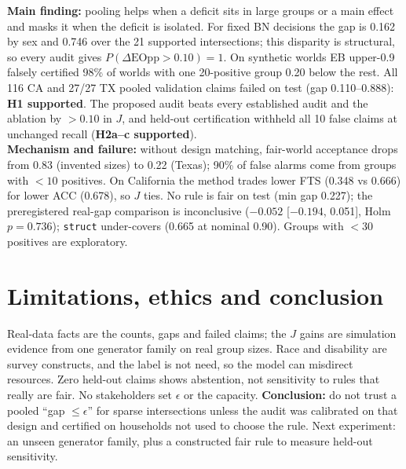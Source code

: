 \documentclass[11pt,a4paper]{article}
\begin{document}
\textbf{Main finding:} pooling helps when a deficit sits in large groups or a main effect and masks it when the
deficit is isolated. For fixed BN decisions the gap is 0.162 by sex and 0.746 over the 21 supported intersections;
this disparity is structural, so every audit gives $P(\Delta\text{EOpp}>0.10)=1$. On synthetic worlds EB upper-0.9
falsely certified 98\% of worlds with one 20-positive group 0.20 below the rest. All 116 CA and 27/27 TX pooled
validation claims failed on test (gap 0.110--0.888): \textbf{H1 supported}. The proposed audit beats every established
audit and the ablation by $>0.10$ in $J$, and held-out certification withheld all 10 false claims at unchanged recall
(\textbf{H2a--c supported}).\\
\textbf{Mechanism and failure:} without design matching, fair-world acceptance drops from 0.83 (invented sizes) to
0.22 (Texas); 90\% of false alarms come from groups with $<10$ positives. On California the method trades lower FTS
(0.348 vs 0.666) for lower ACC (0.678), so $J$ ties. No rule is fair on test (min gap 0.227); the preregistered
real-gap comparison is inconclusive ($-0.052$ [$-0.194$, 0.051], Holm $p=0.736$); \texttt{struct} under-covers (0.665
at nominal 0.90). Groups with $<30$ positives are exploratory.

\section{Limitations, ethics and conclusion}
Real-data facts are the counts, gaps and failed claims; the $J$ gains are simulation evidence from one generator
family on real group sizes. Race and disability are survey constructs, and the label is not need, so the
model can misdirect resources. Zero held-out claims shows abstention, not sensitivity to rules that really are fair.
No stakeholders set $\epsilon$ or the capacity. \textbf{Conclusion:} do not trust a pooled ``gap $\le\epsilon$'' for
sparse intersections unless the audit was calibrated on that design and certified on households not used to choose
the rule. Next experiment: an unseen generator family, plus a constructed fair rule to measure held-out sensitivity.
\end{document}
